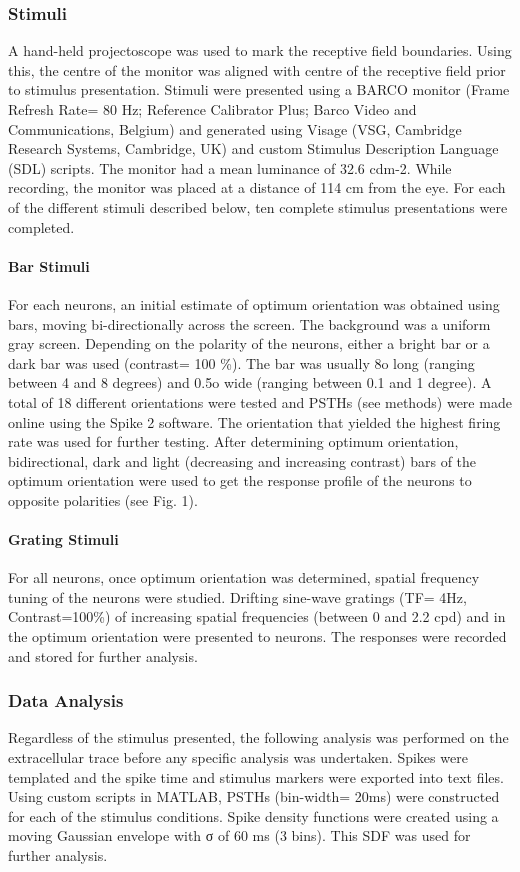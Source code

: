 		\subsubsection{Stimuli}
		A hand-held projectoscope was used to mark the receptive field boundaries. Using this, the centre of the monitor was aligned with centre of the receptive field prior to stimulus presentation. Stimuli were presented using a BARCO monitor (Frame Refresh Rate= 80 Hz; Reference Calibrator Plus; Barco Video and Communications, Belgium) and generated using Visage (VSG, Cambridge Research Systems, Cambridge, UK) and custom Stimulus Description Language (SDL) scripts. The monitor had a mean luminance of 32.6 cdm-2. While recording, the monitor was placed at a distance of 114 cm from the eye. For each of the different stimuli described below, ten complete stimulus presentations were completed.
				\paragraph{Bar Stimuli}
				For each neurons, an initial estimate of optimum orientation was obtained using bars, moving bi-directionally across the screen. The background was a uniform gray screen. Depending on the polarity of the neurons, either a bright bar or a dark bar was used (contrast= 100 \%). The bar was usually 8o long (ranging between 4 and 8 degrees) and 0.5o wide (ranging between 0.1 and 1 degree). A total of 18 different orientations were tested and PSTHs (see methods) were made online using the Spike 2 software. The orientation that yielded the highest firing rate was used for further testing.
				After determining optimum orientation, bidirectional, dark and light (decreasing and increasing contrast) bars of the optimum orientation were used to get the response profile of the neurons to opposite polarities (see Fig. 1). 
				\paragraph{Grating Stimuli}
				For all neurons, once optimum orientation was determined, spatial frequency tuning of the neurons were studied. Drifting sine-wave gratings (TF= 4Hz, Contrast=100\%) of increasing spatial frequencies (between 0 and 2.2 cpd) and in the optimum orientation were presented to neurons. The responses were recorded and stored for further analysis.
				
   		\subsubsection{Data Analysis}
		Regardless of the stimulus presented, the following analysis was performed on the extracellular trace before any specific analysis was undertaken. Spikes were templated and the spike time and stimulus markers were exported into text files. Using custom scripts in MATLAB, PSTHs (bin-width= 20ms) were constructed for each of the stimulus conditions.  Spike density functions were created using a moving Gaussian envelope with σ of 60 ms (3 bins). This SDF was used for further analysis. 
